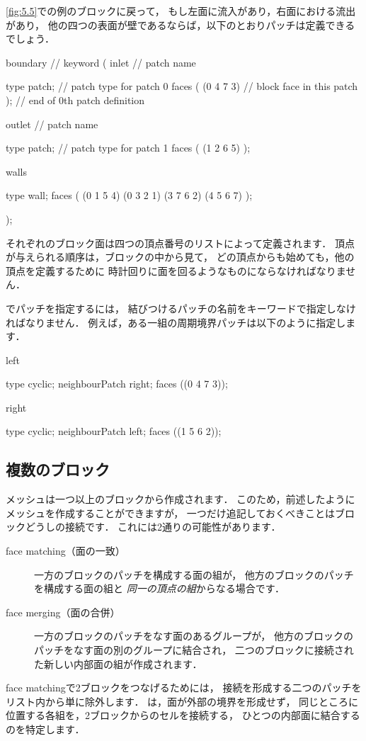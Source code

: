 \autoref{fig:5.5}での例のブロックに戻って，
もし左面に流入があり，右面における流出があり，
他の四つの表面が壁であるならば，以下のとおりパッチは定義できるでしょう．
\begin{OFverbatim}[file]
boundary               // keyword
(
    inlet              // patch name

        type patch;    // patch type for patch 0
        faces
        (
            (0 4 7 3)  // block face in this patch
        );
                       // end of 0th patch definition

    outlet             // patch name

        type patch;    // patch type for patch 1
        faces
        (
            (1 2 6 5)
        );

    walls

        type wall;
        faces
        (
            (0 1 5 4)
            (0 3 2 1)
            (3 7 6 2)
            (4 5 6 7)
        );

);
\end{OFverbatim}
それぞれのブロック面は四つの頂点番号のリストによって定義されます．
頂点が与えられる順序は，ブロックの中から見て，
どの頂点からも始めても，他の頂点を定義するために
時計回りに面を回るようなものにならなければなりません．

でパッチを指定するには，
結びつけるパッチの名前をキーワードで指定しなければなりません．
例えば，ある一組の周期境界パッチは以下のように指定します．
\begin{OFverbatim}[file]
left

    type            cyclic;
    neighbourPatch  right;
    faces           ((0 4 7 3));

right

    type            cyclic;
    neighbourPatch  left;
    faces           ((1 5 6 2));
\end{OFverbatim}


\subsection{複数のブロック}
\label{ssec:5.3.2}
メッシュは一つ以上のブロックから作成されます．
このため，前述したようにメッシュを作成することができますが，
一つだけ追記しておくべきことはブロックどうしの接続です．
これには2通りの可能性があります．
\begin{description}
 \item[face matching（面の一致）]
            一方のブロックのパッチを構成する面の組が，
            他方のブロックのパッチを構成する面の組と
            \emph{同一の頂点の組}からなる場合です．
 \item[face merging（面の合併）]
            一方のブロックのパッチをなす面のあるグループが，
            他方のブロックのパッチをなす面の別のグループに結合され，
            二つのブロックに接続された新しい内部面の組が作成されます．
\end{description}
face matchingで2ブロックをつなげるためには，
接続を形成する二つのパッチをリスト内から単に除外します．
は，面が外部の境界を形成せず，
同じところに位置する各組を，2ブロックからのセルを接続する，
ひとつの内部面に結合するのを特定します．

